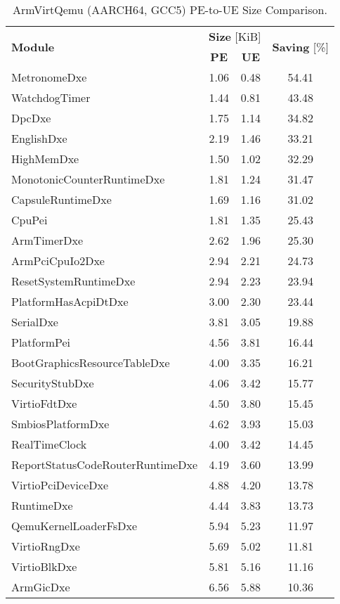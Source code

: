 \begin{longtable}{l c c c}
  \caption{ArmVirtQemu (AARCH64, GCC5) PE-to-UE Size Comparison.}\\\\
  \toprule
  \multirow{2}{*}[-2pt]{\textbf{Module}} & \multicolumn{2}{c}{\textbf{Size} [KiB]} & \multirow{2}{*}[-2pt]{\textbf{Saving} [\%]}\\
  \cmidrule{2-3}
  & \textbf{PE} & \textbf{UE} &\\
  \midrule
  MetronomeDxe & 1.06 & 0.48 & 54.41\\
  WatchdogTimer & 1.44 & 0.81 & 43.48\\
  DpcDxe & 1.75 & 1.14 & 34.82\\
  EnglishDxe & 2.19 & 1.46 & 33.21\\
  HighMemDxe & 1.50 & 1.02 & 32.29\\
  MonotonicCounterRuntimeDxe & 1.81 & 1.24 & 31.47\\
  CapsuleRuntimeDxe & 1.69 & 1.16 & 31.02\\
  CpuPei & 1.81 & 1.35 & 25.43\\
  ArmTimerDxe & 2.62 & 1.96 & 25.30\\
  ArmPciCpuIo2Dxe & 2.94 & 2.21 & 24.73\\
  ResetSystemRuntimeDxe & 2.94 & 2.23 & 23.94\\
  PlatformHasAcpiDtDxe & 3.00 & 2.30 & 23.44\\
  SerialDxe & 3.81 & 3.05 & 19.88\\
  PlatformPei & 4.56 & 3.81 & 16.44\\
  BootGraphicsResourceTableDxe & 4.00 & 3.35 & 16.21\\
  SecurityStubDxe & 4.06 & 3.42 & 15.77\\
  VirtioFdtDxe & 4.50 & 3.80 & 15.45\\
  SmbiosPlatformDxe & 4.62 & 3.93 & 15.03\\
  RealTimeClock & 4.00 & 3.42 & 14.45\\
  ReportStatusCodeRouterRuntimeDxe & 4.19 & 3.60 & 13.99\\
  VirtioPciDeviceDxe & 4.88 & 4.20 & 13.78\\
  RuntimeDxe & 4.44 & 3.83 & 13.73\\
  QemuKernelLoaderFsDxe & 5.94 & 5.23 & 11.97\\
  VirtioRngDxe & 5.69 & 5.02 & 11.81\\
  VirtioBlkDxe & 5.81 & 5.16 & 11.16\\
  ArmGicDxe & 6.56 & 5.88 & 10.36\\

\end{longtable}
